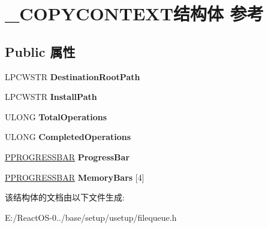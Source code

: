 \hypertarget{struct___c_o_p_y_c_o_n_t_e_x_t}{}\section{\+\_\+\+C\+O\+P\+Y\+C\+O\+N\+T\+E\+X\+T结构体 参考}
\label{struct___c_o_p_y_c_o_n_t_e_x_t}
\subsection*{Public 属性}
\begin{DoxyCompactItemize}
\item 
\mbox{\label{struct___c_o_p_y_c_o_n_t_e_x_t_a7b8b1ec98282d44fdea2c63685b447df}} 
L\+P\+C\+W\+S\+TR {\bfseries Destination\+Root\+Path}
\item 
\mbox{\label{struct___c_o_p_y_c_o_n_t_e_x_t_a3ac83d03d1129da5138dc3d381939652}} 
L\+P\+C\+W\+S\+TR {\bfseries Install\+Path}
\item 
\mbox{\label{struct___c_o_p_y_c_o_n_t_e_x_t_a7449c22630a83c896449100a937c3d44}} 
U\+L\+O\+NG {\bfseries Total\+Operations}
\item 
\mbox{\label{struct___c_o_p_y_c_o_n_t_e_x_t_ac7de189306abfc8387957e9eb0c14d78}} 
U\+L\+O\+NG {\bfseries Completed\+Operations}
\item 
\mbox{\label{struct___c_o_p_y_c_o_n_t_e_x_t_ad26e4c7ed4f4b62f757f24786e86beac}} 
\hyperlink{struct___p_r_o_g_r_e_s_s}{P\+P\+R\+O\+G\+R\+E\+S\+S\+B\+AR} {\bfseries Progress\+Bar}
\item 
\mbox{\label{struct___c_o_p_y_c_o_n_t_e_x_t_a2c7b48bab963727775297280243e9fd2}} 
\hyperlink{struct___p_r_o_g_r_e_s_s}{P\+P\+R\+O\+G\+R\+E\+S\+S\+B\+AR} {\bfseries Memory\+Bars} \mbox{[}4\mbox{]}
\end{DoxyCompactItemize}


该结构体的文档由以下文件生成\+:\begin{DoxyCompactItemize}
\item 
E\+:/\+React\+O\+S-\/0../base/setup/usetup/filequeue.\+h\end{DoxyCompactItemize}
